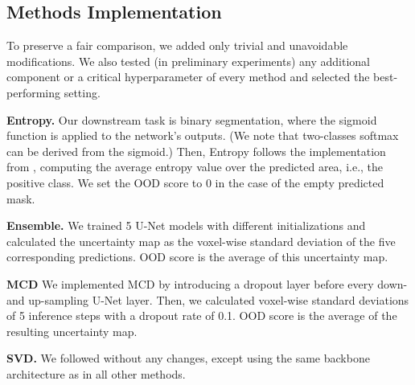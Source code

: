 

\subsection{Methods Implementation}

To preserve a fair comparison, we added only trivial and unavoidable modifications. We also tested (in preliminary experiments) any additional component or a critical hyperparameter of every method and selected the best-performing setting.


\textbf{Entropy.} Our downstream task is binary segmentation, where the sigmoid function is applied to the network's outputs. (We note that two-classes softmax can be derived from the sigmoid.) Then, Entropy follows the implementation from \cite{mehrtash2020confidence,karimi2022improving}, computing the average entropy value over the predicted area, i.e., the positive class. We set the OOD score to 0 in the case of the empty predicted mask.

\textbf{Ensemble.} We trained 5 U-Net models with different initializations and calculated the uncertainty map as the voxel-wise standard deviation of the five corresponding predictions. OOD score is the average of this uncertainty map.

\textbf{MCD} We implemented MCD by introducing a dropout layer before every down- and up-sampling U-Net layer. Then, we calculated voxel-wise standard deviations of 5 inference steps with a dropout rate of 0.1. OOD score is the average of the resulting uncertainty map.

\textbf{SVD.} We followed \cite{karimi2022improving} without any changes, except using the same backbone architecture as in all other methods.

